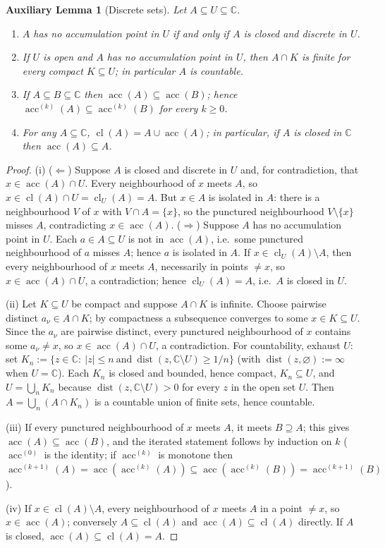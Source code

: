 \documentclass[11pt]{article}
\theoremstyle{definition}
\theoremstyle{remark}
\theoremstyle{plain}
\newtheorem{auxlemma}{Auxiliary Lemma}
\newcommand{\C}{\mathbb{C}}
\newcommand{\acc}{\operatorname{acc}}
\newcommand{\dist}{\operatorname{dist}}
\newcommand{\clo}{\operatorname{cl}}
\begin{document}
\begin{auxlemma}[Discrete sets]\label{lem:discrete}
Let $A\subseteq U\subseteq\C$.
\begin{enumerate}
\item[(i)] $A$ has no accumulation point in $U$ if and only if $A$ is closed and discrete
in $U$.
\item[(ii)] If $U$ is open and $A$ has no accumulation point in $U$, then $A\cap K$ is
finite for every compact $K\subseteq U$; in particular $A$ is countable.
\item[(iii)] If $A\subseteq B\subseteq\C$ then $\acc(A)\subseteq\acc(B)$; hence
$\acc^{(k)}(A)\subseteq\acc^{(k)}(B)$ for every $k\ge0$.
\item[(iv)] For any $A\subseteq\C$, $\clo(A)=A\cup\acc(A)$; in particular, if $A$ is
closed in $\C$ then $\acc(A)\subseteq A$.
\end{enumerate}
\end{auxlemma}

\begin{proof}
(i) ($\Leftarrow$) Suppose $A$ is closed and discrete in $U$ and, for contradiction, that
$x\in\acc(A)\cap U$.  Every neighbourhood of $x$ meets $A$, so
$x\in\clo(A)\cap U=\clo_U(A)=A$.  But $x\in A$ is isolated in $A$: there is a
neighbourhood $V$ of $x$ with $V\cap A=\{x\}$, so the punctured neighbourhood
$V\setminus\{x\}$ misses $A$, contradicting $x\in\acc(A)$.
($\Rightarrow$) Suppose $A$ has no accumulation point in $U$.  Each $a\in A\subseteq U$ is
not in $\acc(A)$, i.e.\ some punctured neighbourhood of $a$ misses $A$; hence $a$ is
isolated in $A$.  If $x\in\clo_U(A)\setminus A$, then every neighbourhood of $x$ meets
$A$, necessarily in points $\ne x$, so $x\in\acc(A)\cap U$, a contradiction; hence
$\clo_U(A)=A$, i.e.\ $A$ is closed in $U$.

(ii) Let $K\subseteq U$ be compact and suppose $A\cap K$ is infinite.  Choose pairwise
distinct $a_\nu\in A\cap K$; by compactness a subsequence converges to some
$x\in K\subseteq U$.  Since the $a_\nu$ are pairwise distinct, every punctured
neighbourhood of $x$ contains some $a_\nu\ne x$, so $x\in\acc(A)\cap U$, a contradiction.
For countability, exhaust $U$: set
$K_n:=\{z\in\C:\ |z|\le n\ \text{and}\ \dist(z,\C\setminus U)\ge 1/n\}$ (with
$\dist(z,\varnothing):=\infty$ when $U=\C$).  Each $K_n$ is closed and bounded, hence
compact, $K_n\subseteq U$, and $U=\bigcup_n K_n$ because
$\dist(z,\C\setminus U)>0$ for every $z$ in the open set $U$.  Then
$A=\bigcup_n(A\cap K_n)$ is a countable union of finite sets, hence countable.

(iii) If every punctured neighbourhood of $x$ meets $A$, it meets $B\supseteq A$; this
gives $\acc(A)\subseteq\acc(B)$, and the iterated statement follows by induction on $k$
($\acc^{(0)}$ is the identity; if $\acc^{(k)}$ is monotone then
$\acc^{(k+1)}(A)=\acc(\acc^{(k)}(A))\subseteq\acc(\acc^{(k)}(B))=\acc^{(k+1)}(B)$).

(iv) If $x\in\clo(A)\setminus A$, every neighbourhood of $x$ meets $A$ in a point
$\ne x$, so $x\in\acc(A)$; conversely $A\subseteq\clo(A)$ and
$\acc(A)\subseteq\clo(A)$ directly.  If $A$ is closed, $\acc(A)\subseteq\clo(A)=A$.
\end{proof}
\end{document}
